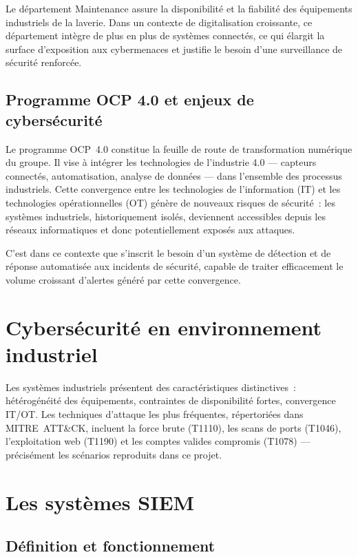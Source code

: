 \documentclass[12pt,a4paper]{report}
\begin{document}
Le département Maintenance assure la disponibilité et la
fiabilité des équipements industriels de la laverie. Dans un
contexte de digitalisation croissante, ce département intègre
de plus en plus de systèmes connectés, ce qui élargit la
surface d'exposition aux cybermenaces et justifie le besoin
d'une surveillance de sécurité renforcée.

\subsection{Programme OCP 4.0 et enjeux de cybersécurité}

Le programme OCP~4.0 constitue la feuille de route de
transformation numérique du groupe. Il vise à intégrer les
technologies de l'industrie 4.0 — capteurs connectés,
automatisation, analyse de données — dans l'ensemble des
processus industriels. Cette convergence entre les
technologies de l'information (IT) et les technologies
opérationnelles (OT) génère de nouveaux risques de sécurité~:
les systèmes industriels, historiquement isolés, deviennent
accessibles depuis les réseaux informatiques et donc
potentiellement exposés aux attaques.

C'est dans ce contexte que s'inscrit le besoin d'un système
de détection et de réponse automatisée aux incidents de
sécurité, capable de traiter efficacement le volume croissant
d'alertes généré par cette convergence.

\section{Cybersécurité en environnement industriel}

Les systèmes industriels présentent des caractéristiques distinctives~: hétérogénéité des équipements, contraintes de disponibilité fortes, convergence IT/OT. Les techniques d'attaque les plus fréquentes, répertoriées dans MITRE~ATT\&CK, incluent la force brute (T1110), les scans de ports (T1046), l'exploitation web (T1190) et les comptes valides compromis (T1078) — précisément les scénarios reproduits dans ce projet.

\section{Les systèmes SIEM}

\subsection{Définition et fonctionnement}
\end{document}
